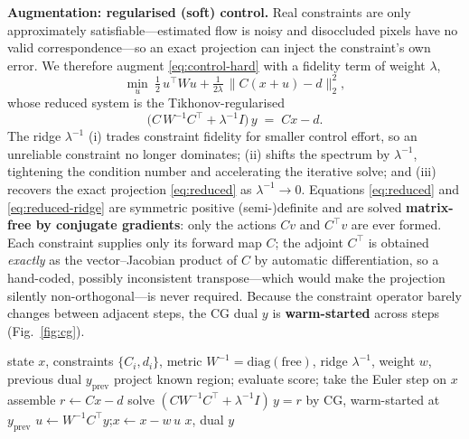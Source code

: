 \medskip\noindent\textbf{Augmentation: regularised (soft) control.} Real
constraints are only approximately satisfiable---estimated flow is noisy and
disoccluded pixels have no valid correspondence---so an exact projection can
inject the constraint's own error. We therefore augment \eqref{eq:control-hard}
with a fidelity term of weight $\lambda$,
\begin{equation}
  \min_{u}\ \tfrac12\,u^{\!\top} W u
  + \tfrac{1}{2\lambda}\,\big\|C(x+u)-d\big\|_2^2,
  \label{eq:control-soft}
\end{equation}
whose reduced system is the Tikhonov-regularised
\begin{equation}
  \big(C\,W^{-1}C^{\!\top} + \lambda^{-1} I\big)\,y \;=\; Cx-d .
  \label{eq:reduced-ridge}
\end{equation}
The ridge $\lambda^{-1}$ (i) trades constraint fidelity for smaller control
effort, so an unreliable constraint no longer dominates; (ii) shifts the spectrum
by $\lambda^{-1}$, tightening the condition number and accelerating the iterative
solve; and (iii) recovers the exact projection \eqref{eq:reduced} as
$\lambda^{-1}\!\to\!0$. Equations \eqref{eq:reduced} and \eqref{eq:reduced-ridge}
are symmetric positive (semi-)definite and are solved \textbf{matrix-free by
conjugate gradients}: only the actions $Cv$ and $C^{\!\top}v$ are ever formed.
Each constraint supplies only its forward map $C$; the adjoint $C^{\!\top}$ is
obtained \emph{exactly} as the vector--Jacobian product of $C$ by automatic
differentiation, so a hand-coded, possibly inconsistent transpose---which would
make the projection silently non-orthogonal---is never required. Because the
constraint operator barely changes between adjacent steps, the CG dual $y$ is
\textbf{warm-started} across steps (Fig.~\ref{fig:cg}).

\begin{algorithm}[t]
\caption{Controlled PF-ODE inpainting step (constraints active).}
\label{alg:control}
\begin{algorithmic}
\Require state $x$, constraints $\{C_i,d_i\}$, metric $W^{-1}{=}\mathrm{diag(free)}$,
         ridge $\lambda^{-1}$, weight $w$, previous dual $y_{\text{prev}}$
\State project known region; evaluate score; take the Euler step on $x$
\State assemble $r \gets Cx-d$ 
\State solve $(C W^{-1}C^{\!\top} + \lambda^{-1}I)\,y = r$ by CG, warm-started at $y_{\text{prev}}$
\State $u \gets W^{-1}C^{\!\top}y$;\quad $x \gets x - w\,u$ 
\State \Return $x$, dual $y$ 
\end{algorithmic}
\end{algorithm}

